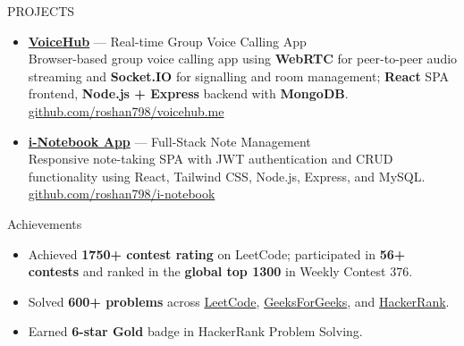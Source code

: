 \documentclass{resume}
\begin{document}
\begin{rSection}{PROJECTS}
\begin{itemize}
\item \href{https://github.com/roshan798/voicehub.me}{\textbf{VoiceHub}}
  --- Real-time Group Voice Calling App\\
  Browser-based group voice calling app using \textbf{WebRTC} for
  peer-to-peer audio streaming and \textbf{Socket.IO} for signalling
  and room management; \textbf{React} SPA frontend, \textbf{Node.js + Express}
  backend with \textbf{MongoDB}.\\
  \href{https://github.com/roshan798/voicehub.me}{github.com/roshan798/voicehub.me}

\item \href{https://i-notebook-app-nine.vercel.app/}{\textbf{i-Notebook App}}
  --- Full-Stack Note Management\\
  Responsive note-taking SPA with JWT authentication and CRUD functionality
  using React, Tailwind CSS, Node.js, Express, and MySQL.\\
  \href{https://github.com/roshan798/i-notebook-app}{github.com/roshan798/i-notebook}

\end{itemize}
\end{rSection}


\begin{rSection}{Achievements}
\begin{itemize}
  \item Achieved \textbf{1750+ contest rating} on LeetCode; participated in
        \textbf{56+ contests} and ranked in the \textbf{global top 1300}
        in Weekly Contest 376.
  \item Solved \textbf{600+ problems} across
        \href{https://leetcode.com/u/Roshan_kumar7989/}{LeetCode},
        \href{https://auth.geeksforgeeks.org/user/roshan_sahu/}{GeeksForGeeks}, and
        \href{https://www.hackerrank.com/rsahu7989}{HackerRank}.
  \item Earned \textbf{6-star Gold} badge in HackerRank Problem Solving.
\end{itemize}
\end{rSection}
\end{document}

